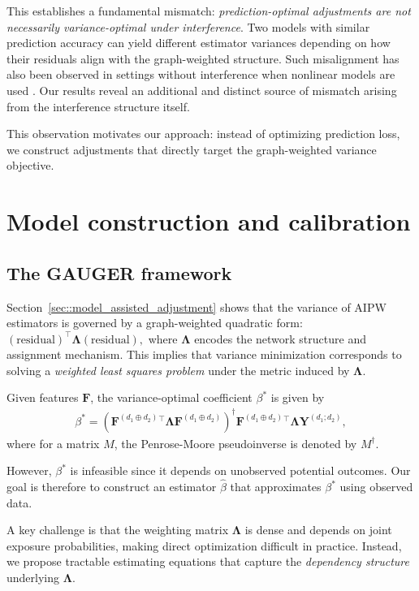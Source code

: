 \documentclass[twoside]{article}
\theoremstyle{plain}
\theoremstyle{definition}
\theoremstyle{remark}
\newcommand{\bY}{\boldsymbol{Y}}
\newcommand{\bF}{\boldsymbol{F}}
\newcommand{\bLambda}{\boldsymbol{\Lambda}}
\newcommand{\bFaug}{\bF^{(d_1\oplus d_2)}}
\begin{document}
This establishes a fundamental mismatch: \emph{prediction-optimal adjustments are not necessarily variance-optimal under interference}. Two models with similar prediction accuracy can yield  different estimator variances depending on how their residuals align with the graph-weighted structure. Such misalignment has also been observed in settings without interference when nonlinear models are used \citep{fogarty2018regression, guo2023generalized}. Our results reveal an additional and distinct source of mismatch arising from the interference structure itself.

This observation motivates our approach: instead of optimizing prediction loss, we construct adjustments that directly target the graph-weighted variance objective.

\section{Model construction and calibration}
\label{sec::calibration}

\subsection{The GAUGER framework}
\label{sec::gauger}
Section~\ref{sec::model_assisted_adjustment} shows that the variance of AIPW estimators is governed by a graph-weighted quadratic form:
$(\text{residual})^\top \bLambda (\text{residual}),$
where $\bLambda$ encodes the network structure and assignment mechanism. This implies that variance minimization corresponds to solving a \emph{weighted least squares problem} under the metric induced by $\bLambda$.

Given features $\bF$, the variance-optimal coefficient $\beta^*$ is given by
\begin{align}\label{eq::beta-star}
    \beta^{*}
    = (\bFaug{}^{\top}\bLambda\bFaug)^{\dagger}\bFaug{}^{\top}\bLambda\bY^{(d_1;d_2)},
\end{align}
where for a matrix $M$, the Penrose-Moore pseudoinverse is denoted  by $M^\dagger$.

However, $\beta^*$ is infeasible since it depends on unobserved potential outcomes. Our goal is therefore to construct an estimator $\hat{\beta}$ that approximates $\beta^*$ using observed data.

A key challenge is that the weighting matrix $\bLambda$ is dense and depends on joint exposure probabilities, making direct optimization difficult in practice. Instead, we propose tractable estimating equations that capture the \emph{dependency structure} underlying $\bLambda$.
\end{document}
